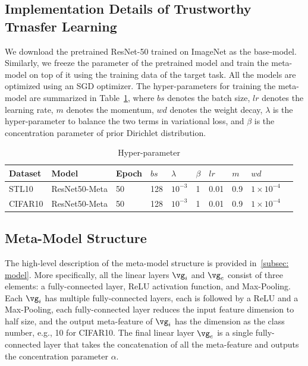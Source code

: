 \subsection{Implementation Details of Trustworthy Trnasfer Learning}
We download the pretrained ResNet-50 trained on ImageNet as the base-model. Similarly, we freeze the parameter of the pretrained model and train the meta-model on top of it using the training data of the target task. All the models are optimized using an SGD optimizer. The hyper-parameters for training the meta-model are summarized in Table~\ref{table: hyper-transfer}, where $bs$ denotes the batch size, $lr$ denotes the learning rate, $m$ denotes the momentum, $wd$ denotes the weight decay, $\lambda$ is the hyper-parameter to balance the two terms in variational loss, and $\beta$ is the concentration parameter of prior Dirichlet distribution. 
\begin{table}[t]
  \caption{Hyper-parameter}
  \centering
  \begin{tabular}{llllllllll}
    \toprule
    Dataset & Model & Epoch & $bs$ & $\lambda$ & $\beta$ & $lr$ & $m$ & $wd$\\
    \midrule
    STL10 & ResNet50-Meta & 50 & 128 & $10^{-3}$ & 1 & 0.01 & 0.9 & $1\times10^{-4}$ \\
    \midrule
    CIFAR10 & ResNet50-Meta & 50 & 128 & $10^{-3}$ & 1 & 0.01 & 0.9 & $1\times10^{-4}$ \\
    \bottomrule
  \end{tabular}
  \label{table: hyper-transfer}
\end{table}

\subsection{Meta-Model Structure}
The high-level description of the meta-model structure is provided in~\ref{subsec: model}. More specifically, all the linear layers $\vg_{i}$ and $\vg_{c}$ consist of three elements: a fully-connected layer, ReLU activation function, and Max-Pooling. Each $\vg_{i}$ has multiple fully-connected layers, each is followed by a ReLU and a Max-Pooling, each fully-connected layer reduces the input feature dimension to half size, and the output meta-feature of $\vg_{i}$ has the dimension as the class number, e.g., 10 for CIFAR10. The final linear layer $\vg_{c}$ is a single fully-connected layer that takes the concatenation of all the meta-feature and outputs the concentration parameter $\alpha$.

